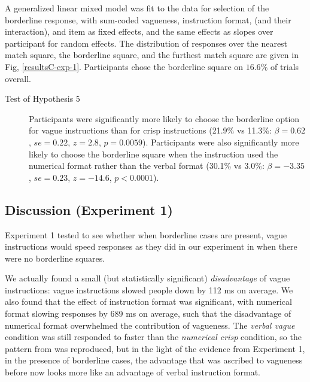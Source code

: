A generalized linear mixed model \citet{jaeger2008categorical} was fit to the data for selection of the borderline response, with sum-coded vagueness, instruction format, (and their interaction), and item as fixed effects, and the same effects as slopes over participant for random effects. The distribution of responses over the nearest match square, the borderline square, and the furthest match square are given in Fig, \ref{resultsC-exp-1}. Participants chose the borderline square on $16.6\%$ of trials overall.

\begin{description}
	\item [Test of Hypothesis 5] Participants were significantly more likely to choose the borderline option for vague instructions than for crisp instructions (21.9\% vs 11.3\%: $\beta=0.62$, $se=0.22$, $z=2.8$, $p=0.0059$). Participants were also significantly more likely to choose the borderline square when the instruction used the numerical format rather than the verbal format (30.1\% vs 3.0\%: $\beta=-3.35$, $se=0.23$, $z=-14.6$, $p<0.0001$). 
\end{description}

\subsection{Discussion (Experiment 1)}

Experiment 1 tested to see whether when borderline cases are present, vague instructions would speed responses as they did in our experiment in \citet{green2013utility} when there were no borderline squares. 

We actually found a small (but statistically significant) \emph{disadvantage} of vague instructions: vague instructions slowed people down by 112 ms on average. We also found that the effect of instruction format was significant, with numerical format slowing responses by 689 ms on average, such that the disadvantage of numerical format overwhelmed the contribution of vagueness. The \emph{verbal vague} condition was still responded to faster than the \emph{numerical crisp} condition, so the pattern from \citet{green2013utility} was reproduced, but in the light of the evidence from Experiment 1, in the presence of borderline cases, the advantage that was ascribed to vagueness before now looks more like an advantage of verbal instruction format.

